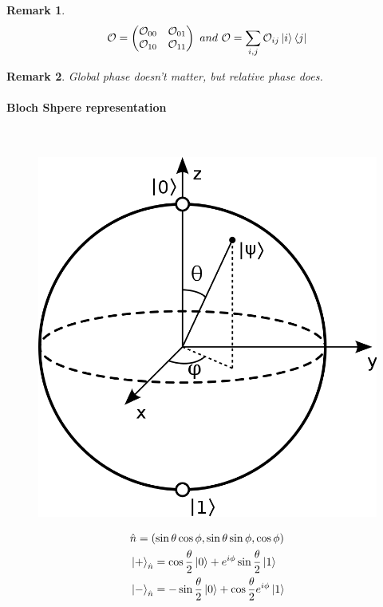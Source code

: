 \documentclass[]{article}
\newtheorem*{remark}{Remark}
\theoremstyle{nonumberplain}
\begin{document}
\begin{remark}
\[
\mathcal{O}=
\begin{pmatrix}
	\mathcal{O}_{00} & \mathcal{O}_{01} \\
	\mathcal{O}_{10} & \mathcal{O}_{11} \\
\end{pmatrix}
\ and \ 
\mathcal{O} = \sum^{}_{i,j} \mathcal{O}_{ij}\ket{i}\bra{j}
\] 
\end{remark}
\begin{remark}
Global phase doesn't matter, but relative phase does.
\end{remark}
\newpage
\paragraph{Bloch Shpere representation}%
\ \\
\begin{figure}[!hbt]
\centering
\includegraphics[scale=0.1]{2.png}
\end{figure}
\begin{equation*}
\begin{aligned}
	& \hat{n}=(\sin{\theta}\cos{\phi},\sin{\theta}\sin{\phi},\cos{\phi})\\
	& \ket{+}_{\hat{n}}=\cos{\frac{\theta}{2}}\ket{0}+e^{i\phi}\sin{\frac{\theta}{2}} \ket{1} \\
	& \ket{-}_{\hat{n}}=-\sin{\frac{\theta}{2}}\ket{0}+\cos{\frac{\theta}{2}} e^{i\phi}\ket{1}
\end{aligned}
\end{equation*}
\end{document}
